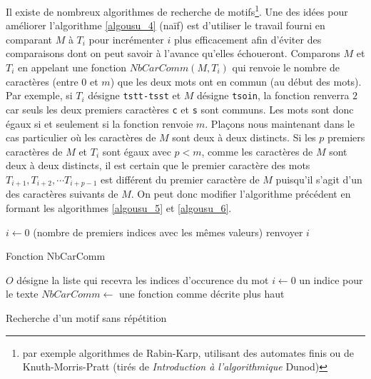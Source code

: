 Il existe de nombreux algorithmes de recherche de motifs\footnote{par exemple algorithmes de Rabin-Karp, utilisant des automates finis ou de Knuth-Morris-Pratt (tirés de \emph{Introduction à l'algorithmique} Dunod)}. Une des idées pour améliorer l'algorithme \ref{algousu_4} (naïf) est d'utiliser le travail fourni en comparant $M$ à $T_i$ pour incrémenter $i$ plus efficacement afin d'éviter des comparaisons dont on peut savoir à l'avance qu'elles échoueront.\newline
Comparons $M$ et $T_i$ en appelant une fonction $NbCarComm(M,T_i)$ qui renvoie le nombre de caractères (entre 0 et $m$) que les deux mots ont en commun (au début des mots).\newline
Par exemple, si $T_i$ désigne \verb|tstt-tsst| et $M$ désigne \verb|tsoin|, la fonction renverra $2$ car seuls les deux premiers caractères \verb|c| et \verb|s| sont communs. Les mots sont donc égaux si et seulement si la fonction renvoie $m$.\newline
Plaçons nous maintenant dans le cas particulier où les caractères de $M$ sont deux à deux distincts.\newline
Si les $p$ premiers caractères de $M$ et $T_i$ sont égaux avec $p<m$, comme les caractères de $M$ sont deux à deux distincts, il est certain que le premier caractère des mots $T_{i+1}, T_{i+2},\cdots T_{i+p-1}$ est différent du premier caractère de $M$ puisqu'il s'agit d'un des caractères suivants de $M$.\newline
On peut donc modifier l'algorithme précédent en formant les algorithmes \ref{algousu_5} et \ref{algousu_6}.
\begin{algorithm}
  $i\leftarrow 0$ (nombre de premiers indices avec les mêmes valeurs)\;
  renvoyer $i$\;
  \caption{Fonction NbCarComm}
  \label{algousu_5}
\end{algorithm}
\begin{algorithm}
  $O$ désigne la liste qui recevra les indices d'occurence du mot\;
  $i\leftarrow 0$ un indice pour le texte \;
  $NbCarComm \leftarrow$ une fonction comme décrite plus haut\;
  \caption{Recherche d'un motif sans répétition}
  \label{algousu_6}
\end{algorithm}

